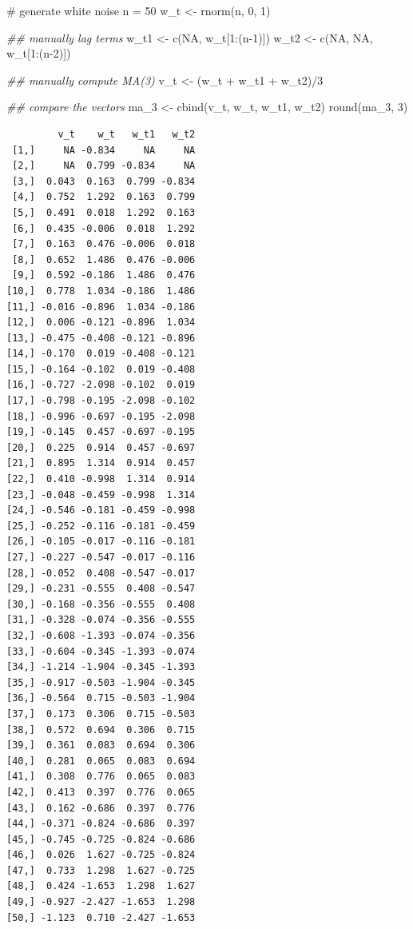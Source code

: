 \documentclass[
  letterpaper,
  DIV=11,
  numbers=noendperiod]{scrreprt}
\newenvironment{Shaded}{\begin{snugshade}}{\end{snugshade}}
\newcommand{\CommentTok}[1]{\textcolor[rgb]{0.37,0.37,0.37}{#1}}
\newcommand{\ConstantTok}[1]{\textcolor[rgb]{0.56,0.35,0.01}{#1}}
\newcommand{\DecValTok}[1]{\textcolor[rgb]{0.68,0.00,0.00}{#1}}
\newcommand{\DocumentationTok}[1]{\textcolor[rgb]{0.37,0.37,0.37}{\textit{#1}}}
\newcommand{\FunctionTok}[1]{\textcolor[rgb]{0.28,0.35,0.67}{#1}}
\newcommand{\NormalTok}[1]{\textcolor[rgb]{0.00,0.23,0.31}{#1}}
\newcommand{\OtherTok}[1]{\textcolor[rgb]{0.00,0.23,0.31}{#1}}
\newcommand{\SpecialCharTok}[1]{\textcolor[rgb]{0.37,0.37,0.37}{#1}}
\begin{document}
\begin{Shaded}
\begin{Highlighting}[]
\CommentTok{\# generate white noise}
\NormalTok{n }\OtherTok{=} \DecValTok{50}
\NormalTok{w\_t }\OtherTok{\textless{}{-}} \FunctionTok{rnorm}\NormalTok{(n, }\DecValTok{0}\NormalTok{, }\DecValTok{1}\NormalTok{)}

\DocumentationTok{\#\# manually lag terms}
\NormalTok{w\_t1 }\OtherTok{\textless{}{-}} \FunctionTok{c}\NormalTok{(}\ConstantTok{NA}\NormalTok{, w\_t[}\DecValTok{1}\SpecialCharTok{:}\NormalTok{(n}\DecValTok{{-}1}\NormalTok{)])}
\NormalTok{w\_t2 }\OtherTok{\textless{}{-}} \FunctionTok{c}\NormalTok{(}\ConstantTok{NA}\NormalTok{, }\ConstantTok{NA}\NormalTok{, w\_t[}\DecValTok{1}\SpecialCharTok{:}\NormalTok{(n}\DecValTok{{-}2}\NormalTok{)])}

\DocumentationTok{\#\# manually compute MA(3)}
\NormalTok{v\_t }\OtherTok{\textless{}{-}}\NormalTok{ (w\_t }\SpecialCharTok{+}\NormalTok{ w\_t1 }\SpecialCharTok{+}\NormalTok{ w\_t2)}\SpecialCharTok{/}\DecValTok{3}

\DocumentationTok{\#\# compare the vectors}
\NormalTok{ma\_3 }\OtherTok{\textless{}{-}} \FunctionTok{cbind}\NormalTok{(v\_t, w\_t, w\_t1, w\_t2)}
\FunctionTok{round}\NormalTok{(ma\_3, }\DecValTok{3}\NormalTok{)}
\end{Highlighting}
\end{Shaded}

\begin{verbatim}
         v_t    w_t   w_t1   w_t2
 [1,]     NA -0.834     NA     NA
 [2,]     NA  0.799 -0.834     NA
 [3,]  0.043  0.163  0.799 -0.834
 [4,]  0.752  1.292  0.163  0.799
 [5,]  0.491  0.018  1.292  0.163
 [6,]  0.435 -0.006  0.018  1.292
 [7,]  0.163  0.476 -0.006  0.018
 [8,]  0.652  1.486  0.476 -0.006
 [9,]  0.592 -0.186  1.486  0.476
[10,]  0.778  1.034 -0.186  1.486
[11,] -0.016 -0.896  1.034 -0.186
[12,]  0.006 -0.121 -0.896  1.034
[13,] -0.475 -0.408 -0.121 -0.896
[14,] -0.170  0.019 -0.408 -0.121
[15,] -0.164 -0.102  0.019 -0.408
[16,] -0.727 -2.098 -0.102  0.019
[17,] -0.798 -0.195 -2.098 -0.102
[18,] -0.996 -0.697 -0.195 -2.098
[19,] -0.145  0.457 -0.697 -0.195
[20,]  0.225  0.914  0.457 -0.697
[21,]  0.895  1.314  0.914  0.457
[22,]  0.410 -0.998  1.314  0.914
[23,] -0.048 -0.459 -0.998  1.314
[24,] -0.546 -0.181 -0.459 -0.998
[25,] -0.252 -0.116 -0.181 -0.459
[26,] -0.105 -0.017 -0.116 -0.181
[27,] -0.227 -0.547 -0.017 -0.116
[28,] -0.052  0.408 -0.547 -0.017
[29,] -0.231 -0.555  0.408 -0.547
[30,] -0.168 -0.356 -0.555  0.408
[31,] -0.328 -0.074 -0.356 -0.555
[32,] -0.608 -1.393 -0.074 -0.356
[33,] -0.604 -0.345 -1.393 -0.074
[34,] -1.214 -1.904 -0.345 -1.393
[35,] -0.917 -0.503 -1.904 -0.345
[36,] -0.564  0.715 -0.503 -1.904
[37,]  0.173  0.306  0.715 -0.503
[38,]  0.572  0.694  0.306  0.715
[39,]  0.361  0.083  0.694  0.306
[40,]  0.281  0.065  0.083  0.694
[41,]  0.308  0.776  0.065  0.083
[42,]  0.413  0.397  0.776  0.065
[43,]  0.162 -0.686  0.397  0.776
[44,] -0.371 -0.824 -0.686  0.397
[45,] -0.745 -0.725 -0.824 -0.686
[46,]  0.026  1.627 -0.725 -0.824
[47,]  0.733  1.298  1.627 -0.725
[48,]  0.424 -1.653  1.298  1.627
[49,] -0.927 -2.427 -1.653  1.298
[50,] -1.123  0.710 -2.427 -1.653
\end{verbatim}
\end{document}
